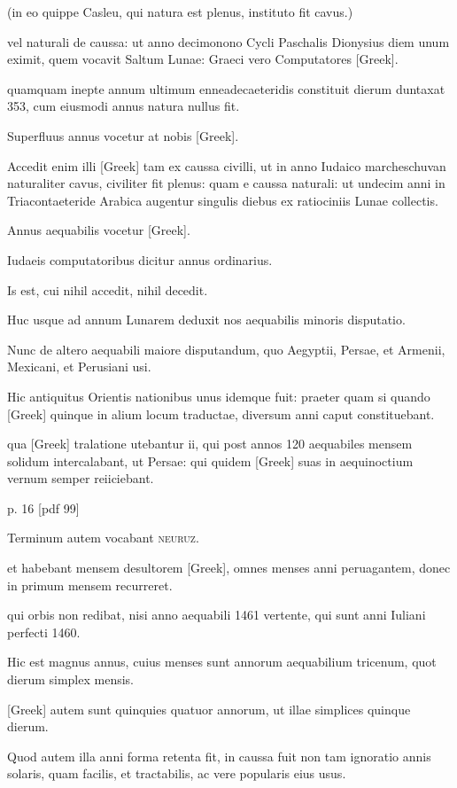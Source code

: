 (in eo quippe Casleu, qui natura est plenus, instituto fit cavus.)

vel naturali de caussa: ut anno
decimonono Cycli Paschalis Dionysius diem unum eximit, quem
vocavit Saltum Lunae: Graeci vero Computatores \textgreek{[Greek]}.

quamquam inepte annum ultimum enneadecaeteridis constituit dierum
duntaxat 353, cum eiusmodi annus natura nullus fit.

Superfluus
annus vocetur at nobis \textgreek{[Greek]}.

Accedit enim illi \textgreek{[Greek]}
tam ex caussa civilli, ut in anno Iudaico marcheschuvan naturaliter
cavus, civiliter fit plenus: quam e caussa naturali: ut undecim anni
in Triacontaeteride Arabica augentur singulis diebus ex ratiociniis
Lunae collectis.

Annus aequabilis vocetur \textgreek{[Greek]}.

Iudaeis computatoribus
dicitur annus ordinarius.

Is est, cui nihil accedit, nihil decedit.

Huc usque ad annum Lunarem deduxit nos aequabilis minoris
disputatio.

Nunc de altero aequabili maiore disputandum, quo Aegyptii,
Persae, et Armenii, Mexicani, et Perusiani usi.

Hic antiquitus
Orientis nationibus unus idemque fuit: praeter quam si quando \textgreek{[Greek]}
quinque in alium locum traductae, diversum anni caput constituebant.

qua \textgreek{[Greek]} tralatione utebantur ii, qui post annos 120
aequabiles mensem solidum intercalabant, ut Persae: qui quidem \textgreek{[Greek]}
suas in aequinoctium vernum semper reiiciebant.


p. 16 [pdf 99]

Terminum autem vocabant \textsc{neuruz}.

et habebant mensem desultorem
\textgreek{[Greek]}, omnes menses anni peruagantem, donec in primum
mensem recurreret.

qui orbis non redibat, nisi anno aequabili 1461
vertente, qui sunt anni Iuliani perfecti 1460.

Hic est magnus annus,
cuius menses sunt annorum aequabilium tricenum, quot dierum simplex
mensis.

\textgreek{[Greek]} autem sunt quinquies quatuor annorum, ut
illae simplices quinque dierum.

Quod autem illa anni forma retenta
fit, in caussa fuit non tam ignoratio annis solaris,
 quam facilis, et tractabilis, ac vere popularis eius usus.

